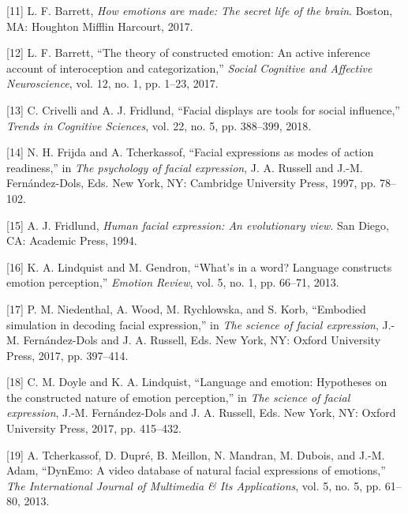 \documentclass[conference,final,]{IEEEtran}
\begin{document}
\leavevmode\hypertarget{ref-barrett2017emotions}{}%
{[}11{]} L. F. Barrett, \emph{How emotions are made: The secret life of
the brain}. Boston, MA: Houghton Mifflin Harcourt, 2017.

\leavevmode\hypertarget{ref-barrett2017theory}{}%
{[}12{]} L. F. Barrett, ``The theory of constructed emotion: An active
inference account of interoception and categorization,'' \emph{Social
Cognitive and Affective Neuroscience}, vol. 12, no. 1, pp. 1--23, 2017.

\leavevmode\hypertarget{ref-crivelli2018facial}{}%
{[}13{]} C. Crivelli and A. J. Fridlund, ``Facial displays are tools for
social influence,'' \emph{Trends in Cognitive Sciences}, vol. 22, no. 5,
pp. 388--399, 2018.

\leavevmode\hypertarget{ref-frijda1997facial}{}%
{[}14{]} N. H. Frijda and A. Tcherkassof, ``Facial expressions as modes
of action readiness,'' in \emph{The psychology of facial expression}, J.
A. Russell and J.-M. Fernández-Dols, Eds. New York, NY: Cambridge
University Press, 1997, pp. 78--102.

\leavevmode\hypertarget{ref-fridlund1994human}{}%
{[}15{]} A. J. Fridlund, \emph{Human facial expression: An evolutionary
view}. San Diego, CA: Academic Press, 1994.

\leavevmode\hypertarget{ref-lindquist2013s}{}%
{[}16{]} K. A. Lindquist and M. Gendron, ``What's in a word? Language
constructs emotion perception,'' \emph{Emotion Review}, vol. 5, no. 1,
pp. 66--71, 2013.

\leavevmode\hypertarget{ref-niedenthal2017embodied}{}%
{[}17{]} P. M. Niedenthal, A. Wood, M. Rychlowska, and S. Korb,
``Embodied simulation in decoding facial expression,'' in \emph{The
science of facial expression}, J.-M. Fernández-Dols and J. A. Russell,
Eds. New York, NY: Oxford University Press, 2017, pp. 397--414.

\leavevmode\hypertarget{ref-doyle2017language}{}%
{[}18{]} C. M. Doyle and K. A. Lindquist, ``Language and emotion:
Hypotheses on the constructed nature of emotion perception,'' in
\emph{The science of facial expression}, J.-M. Fernández-Dols and J. A.
Russell, Eds. New York, NY: Oxford University Press, 2017, pp. 415--432.

\leavevmode\hypertarget{ref-tcherkassof2013dynemo}{}%
{[}19{]} A. Tcherkassof, D. Dupré, B. Meillon, N. Mandran, M. Dubois,
and J.-M. Adam, ``DynEmo: A video database of natural facial expressions
of emotions,'' \emph{The International Journal of Multimedia \& Its
Applications}, vol. 5, no. 5, pp. 61--80, 2013.
\end{document}
